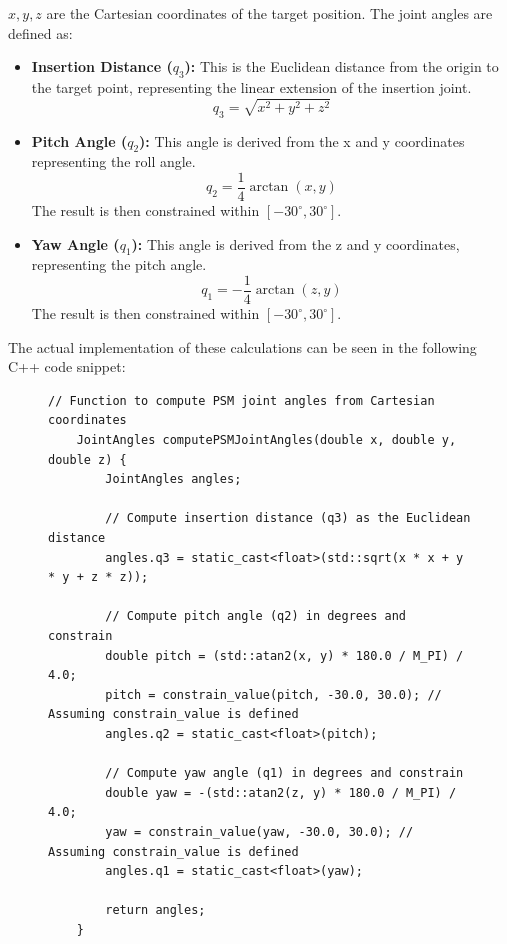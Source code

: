  $x, y, z$ are the Cartesian coordinates of the target position. The joint angles are defined as:

\begin{itemize}
    \item \textbf{Insertion Distance ($q_3$):} This is the Euclidean distance from the origin to the target point, representing the linear extension of the insertion joint.
    $$q_3 = \sqrt{x^2 + y^2 + z^2}$$
    \item \textbf{Pitch Angle ($q_2$):} This angle is derived from the x and y coordinates representing the roll angle.
    $$q_2 = \frac{1}{4} \operatorname{arctan}(x, y)$$
    The result is then constrained within $[-30^\circ, 30^\circ]$.
    \item \textbf{Yaw Angle ($q_1$):} This angle is derived from the z and y coordinates, representing the pitch angle.
    $$q_1 = -\frac{1}{4} \operatorname{arctan}(z, y)$$
    The result is then constrained within $[-30^\circ, 30^\circ]$.
\end{itemize}


The actual implementation of these calculations can be seen in the following C++ code snippet:
\begin{figure}[H] %
    \centering %
    \begin{lstlisting}[caption={C++ Function for Joint Angle Calculation}, label={lst:joint_angle_calc}]
    // Function to compute PSM joint angles from Cartesian coordinates
    JointAngles computePSMJointAngles(double x, double y, double z) {
        JointAngles angles;

        // Compute insertion distance (q3) as the Euclidean distance
        angles.q3 = static_cast<float>(std::sqrt(x * x + y * y + z * z));

        // Compute pitch angle (q2) in degrees and constrain
        double pitch = (std::atan2(x, y) * 180.0 / M_PI) / 4.0;
        pitch = constrain_value(pitch, -30.0, 30.0); // Assuming constrain_value is defined
        angles.q2 = static_cast<float>(pitch);

        // Compute yaw angle (q1) in degrees and constrain
        double yaw = -(std::atan2(z, y) * 180.0 / M_PI) / 4.0;
        yaw = constrain_value(yaw, -30.0, 30.0); // Assuming constrain_value is defined
        angles.q1 = static_cast<float>(yaw);

        return angles;
    }
    \end{lstlisting}
    \label{fig:joint_angle_listing} %
\end{figure}



